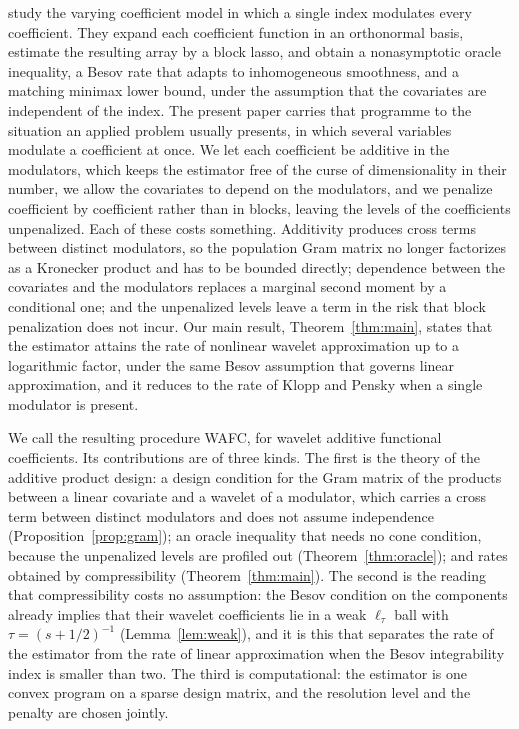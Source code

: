 \documentclass[12pt]{article} %
\theoremstyle{definition}
\begin{document}
\citet{Klopp-Pensky-2015} study the varying coefficient model in which a
single index modulates every coefficient. They expand each coefficient
function in an orthonormal basis, estimate the resulting array by a block
lasso, and obtain a nonasymptotic oracle inequality, a Besov rate that adapts
to inhomogeneous smoothness, and a matching minimax lower bound, under the
assumption that the covariates are independent of the index. The present paper
carries that programme to the situation an applied problem usually presents,
in which several variables modulate a coefficient at once. We let each
coefficient be additive in the modulators, which keeps the estimator free of
the curse of dimensionality in their number, we allow the covariates to depend
on the modulators, and we penalize coefficient by coefficient rather than in
blocks, leaving the levels of the coefficients unpenalized. Each of these
costs something. Additivity produces cross terms between distinct modulators,
so the population Gram matrix no longer factorizes as a Kronecker product and
has to be bounded directly; dependence between the covariates and the
modulators replaces a marginal second moment by a conditional one; and the
unpenalized levels leave a term in the risk that block penalization does not
incur. Our main result, Theorem~\ref{thm:main}, states that the estimator
attains the rate of nonlinear wavelet approximation up to a logarithmic
factor, under the same Besov assumption that governs \textcolor{colR1}{linear approximation}, and it
reduces to the rate of Klopp and Pensky when a single modulator is present.

We call the resulting procedure WAFC, for wavelet additive functional
coefficients. Its contributions are of three kinds. The first is the theory of
the additive product design: a design condition for the Gram matrix of the
products between a linear covariate and a wavelet of a modulator, which
carries a cross term between distinct modulators and does not assume
independence (Proposition~\ref{prop:gram}); an oracle inequality that needs no
cone condition, because the unpenalized levels are profiled out
(Theorem~\ref{thm:oracle}); and rates obtained by compressibility
(Theorem~\ref{thm:main}). The second is the reading that compressibility costs
no assumption: the Besov condition on the components already implies that
their wavelet coefficients lie in a weak $\ell_\tau$ ball with
$\tau = (s+1/2)^{-1}$ (Lemma~\ref{lem:weak}), and it is this that separates
the rate of the estimator from the rate of \textcolor{colR1}{linear approximation} when the Besov
integrability index is smaller than two. The third is computational: the
estimator is one convex program on a sparse design matrix, and the resolution
level and the penalty are chosen jointly.
\end{document}
